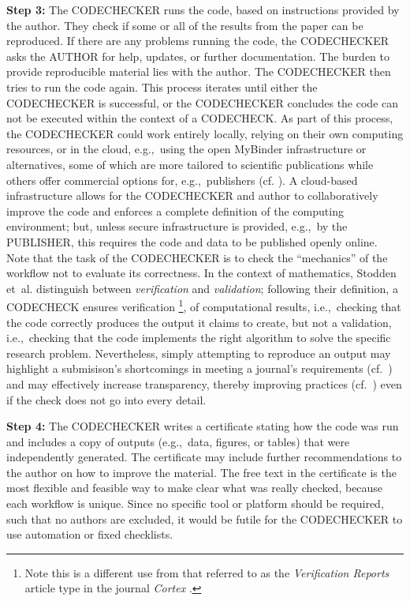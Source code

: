 \documentclass[12pt]{article}
\begin{document}
\textbf{Step 3:} The CODECHECKER runs the code, based on instructions provided by
the author. They check if some or all of the results from the paper can be
reproduced. If there are
any problems running the code, the CODECHECKER asks the AUTHOR for help,
updates, or further documentation.
The burden to provide reproducible material lies with the author.
The CODECHECKER then tries to run the code again.
This process iterates until either the CODECHECKER is successful,
or the CODECHECKER concludes the code can not be executed within the context of a CODECHECK.
As part of this process, the CODECHECKER could work entirely locally, relying on their own computing resources, or in the cloud, e.g.,~using the open MyBinder infrastructure \cite{jupyter_binder_2018} or alternatives, some of which are more tailored to scientific publications while others offer commercial options for, e.g.,~publishers (cf. \cite{konkol_publishing_2020}).
A cloud-based infrastructure allows for the CODECHECKER and author to collaboratively improve the code and enforces a complete definition of the computing environment; but, unless secure infrastructure is provided, e.g.,~by the PUBLISHER, this requires the code and data to be published openly online.
Note that the task of the CODECHECKER is to check the ``mechanics'' of the workflow not to evaluate its correctness. 
In the context of mathematics, Stodden et~al. \cite{stodden_setting_2013} distinguish between \emph{verification} and \emph{validation};
following their definition, a CODECHECK ensures verification
\footnote{Note this is a different use from that referred to as the \emph{Verification Reports} article type in the journal \emph{Cortex} \cite{chambers_verification_2020}.},
of computational results, i.e.,~checking that the code correctly produces the output it claims to create, but not a validation, i.e.,~checking that the code implements the right algorithm to solve the specific research problem.
Nevertheless, simply attempting to reproduce an output may highlight a submisison's shortcomings in meeting a journal's requirements (cf.~\cite{christian_journal_2020}) and may effectively increase transparency, thereby improving practices (cf.~\cite{nosek_scientific_2012}) even if the check does not go into every detail.

\textbf{Step 4:} The CODECHECKER writes a certificate stating how the code was
run and includes a copy of outputs (e.g.,~data, figures, or tables) that were
independently generated.
The certificate may include further recommendations to the author on how to improve the material.
The free text in the certificate is the most flexible and feasible way to 
make clear what was really checked, because each workflow is unique.
Since no specific tool or platform should be required, such that no authors are excluded, it would be futile for the CODECHECKER to use automation or fixed checklists.
\end{document}
